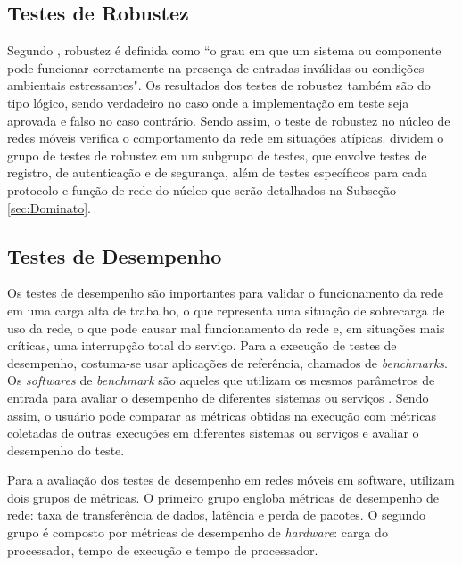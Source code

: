 \subsection{Testes de Robustez}

Segundo \cite[p.~64, tradução nossa]{IEEE.Standard.Glossary}, robustez é definida como ``o grau em que um sistema ou componente pode funcionar corretamente na presença de entradas inválidas ou condições ambientais estressantes".
Os resultados dos testes de robustez também são do tipo lógico, sendo verdadeiro no caso onde a implementação em teste seja aprovada e falso no caso contrário.
Sendo assim, o teste de robustez no núcleo de redes móveis verifica o comportamento da rede em situações atípicas. \cite{Dominato2021} dividem o grupo de testes de robustez em um subgrupo de testes, que envolve testes de registro, de autenticação e de segurança, além de testes específicos para cada protocolo e função de rede do núcleo que serão detalhados na Subseção \ref{sec:Dominato}.

\subsection{Testes de Desempenho}

Os testes de desempenho são importantes para validar o funcionamento da rede em uma carga alta de trabalho, o que representa uma situação de sobrecarga de uso da rede, o que pode causar mal funcionamento da rede e, em situações mais críticas, uma interrupção total do serviço.
Para a execução de testes de desempenho, costuma-se usar aplicações de referência, chamados de \textit{benchmarks}.
Os \textit{softwares} de \textit{benchmark} são aqueles que utilizam os mesmos parâmetros de entrada para avaliar o desempenho de diferentes sistemas ou serviços \cite{Boano2018}.
Sendo assim, o usuário pode comparar as métricas obtidas na execução com métricas coletadas de outras execuções em diferentes sistemas ou serviços e avaliar o desempenho do teste.

Para a avaliação dos testes de desempenho em redes móveis em software, \cite{Lee2021} utilizam dois grupos de métricas.
O primeiro grupo engloba métricas de desempenho de rede: taxa de transferência de dados, latência e perda de pacotes.
O segundo grupo é composto por métricas de desempenho de \textit{hardware}: carga do processador, tempo de execução e tempo de processador.

